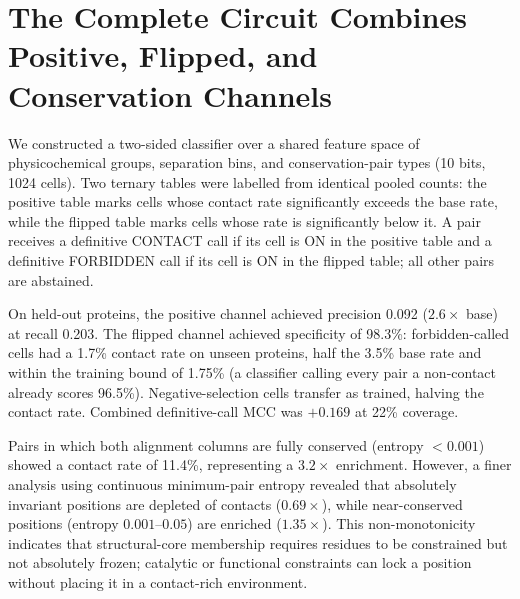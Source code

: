 \section{The Complete Circuit Combines Positive, Flipped, and Conservation Channels}
\label{sec:res-complete}

We constructed a two-sided classifier over a shared feature space of
physicochemical groups, separation bins, and conservation-pair types
(10 bits, 1024 cells).  Two ternary tables were labelled from identical pooled
counts: the positive table marks cells whose contact rate significantly exceeds
the base rate, while the flipped table marks cells whose rate is significantly
below it.  A pair receives a definitive CONTACT call if its cell is ON in the
positive table and a definitive FORBIDDEN call if its cell is ON in the
flipped table; all other pairs are abstained.

On held-out proteins, the positive channel achieved precision 0.092
($2.6\times$ base) at recall 0.203.  The flipped channel achieved specificity
of 98.3\%: forbidden-called cells had a 1.7\% contact rate on unseen proteins, half the 3.5\% base rate and within the training bound of 1.75\% (a classifier calling every pair a non-contact already scores 96.5\%).  Negative-selection cells transfer as trained,
halving the contact rate.  Combined definitive-call MCC was
$+0.169$ at 22\% coverage.

Pairs in which both alignment columns are fully conserved (entropy $< 0.001$)
showed a contact rate of 11.4\%, representing a $3.2\times$ enrichment.
However, a finer analysis using continuous minimum-pair entropy revealed that
absolutely invariant positions are depleted of contacts ($0.69\times$), while
near-conserved positions (entropy $0.001$--$0.05$) are enriched ($1.35\times$).
This non-monotonicity indicates that structural-core membership requires
residues to be constrained but not absolutely frozen; catalytic or functional
constraints can lock a position without placing it in a contact-rich
environment.
